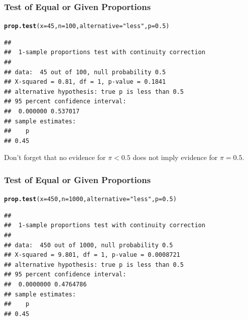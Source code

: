 \documentclass[12pt]{beamer}\usepackage[]{graphicx}\usepackage[]{color}
\makeatletter
\newcommand{\hlnum}[1]{\textcolor[rgb]{0.686,0.059,0.569}{#1}}%
\newcommand{\hlstr}[1]{\textcolor[rgb]{0.192,0.494,0.8}{#1}}%
\newcommand{\hlstd}[1]{\textcolor[rgb]{0.345,0.345,0.345}{#1}}%
\newcommand{\hlkwc}[1]{\textcolor[rgb]{0.333,0.667,0.333}{#1}}%
\newcommand{\hlkwd}[1]{\textcolor[rgb]{0.737,0.353,0.396}{\textbf{#1}}}%
\newenvironment{kframe}{%
 \def\at@end@of@kframe{}%
 \ifinner\ifhmode%
  \def\at@end@of@kframe{\end{minipage}}%
  \begin{minipage}{\columnwidth}%
 \fi\fi%
 \def\FrameCommand##1{\hskip\@totalleftmargin \hskip-\fboxsep
 \colorbox{shadecolor}{##1}\hskip-\fboxsep
     \hskip-\linewidth \hskip-\@totalleftmargin \hskip\columnwidth}%
 \MakeFramed {\advance\hsize-\width
   \@totalleftmargin\z@ \linewidth\hsize
   \@setminipage}}%
 {\par\unskip\endMakeFramed%
 \at@end@of@kframe}
\newenvironment{knitrout}{}{} %
\makeatother
\begin{document}
\begin{frame}[fragile]
\frametitle{Test of Equal or Given Proportions}

\begin{knitrout}\small
{}\color{fgcolor}\begin{kframe}
\begin{alltt}
\hlkwd{prop.test}\hlstd{(}\hlkwc{x}\hlstd{=}\hlnum{45}\hlstd{,} \hlkwc{n}\hlstd{=}\hlnum{100}\hlstd{,} \hlkwc{alternative}\hlstd{=}\hlstr{"less"}\hlstd{,} \hlkwc{p}\hlstd{=}\hlnum{0.5}\hlstd{)}
\end{alltt}
\begin{verbatim}
## 
## 	1-sample proportions test with continuity correction
## 
## data:  45 out of 100, null probability 0.5
## X-squared = 0.81, df = 1, p-value = 0.1841
## alternative hypothesis: true p is less than 0.5
## 95 percent confidence interval:
##  0.000000 0.537017
## sample estimates:
##    p 
## 0.45
\end{verbatim}
\end{kframe}
\end{knitrout}
 Don't forget that no evidence for $\pi< 0.5$ does not imply evidence for $\pi=0.5$.
\end{frame}


\begin{frame}[fragile]
\frametitle{Test of Equal or Given Proportions}

\begin{knitrout}\small
{}\color{fgcolor}\begin{kframe}
\begin{alltt}
\hlkwd{prop.test}\hlstd{(}\hlkwc{x}\hlstd{=}\hlnum{450}\hlstd{,} \hlkwc{n}\hlstd{=}\hlnum{1000}\hlstd{,} \hlkwc{alternative}\hlstd{=}\hlstr{"less"}\hlstd{,} \hlkwc{p}\hlstd{=}\hlnum{0.5}\hlstd{)}
\end{alltt}
\begin{verbatim}
## 
## 	1-sample proportions test with continuity correction
## 
## data:  450 out of 1000, null probability 0.5
## X-squared = 9.801, df = 1, p-value = 0.0008721
## alternative hypothesis: true p is less than 0.5
## 95 percent confidence interval:
##  0.0000000 0.4764786
## sample estimates:
##    p 
## 0.45
\end{verbatim}
\end{kframe}
\end{knitrout}

\end{frame}
\end{document}
